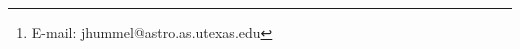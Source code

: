 \author[J.~A. Hummel et al.]
{Jacob~A.~Hummel$^1$\thanks{E-mail: jhummel@astro.as.utexas.edu},
  Athena~Stacy$^2$, Myoungwon~Jeon$^1$, Anthony~Oliveri$^1$, 
\newauthor Milo\v s~Milosavljevi\'c$^1$ and Volker~Bromm$^1$\\
$^1$Department of Astronomy, The University of Texas at Austin, TX 78712, USA\\
$^2$University of California, Berkeley, CA 94720, USA
 }
